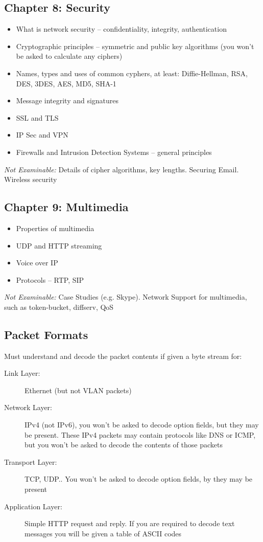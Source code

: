 \documentclass[12pt, a4paper]{article}
\begin{document}
\begin{multicols*}{2}
	\subsection{Chapter 8: Security}
	\begin{itemize}
		\item What is network security -- confidentiality, integrity, authentication
		\item Cryptographic principles -- symmetric and public key algorithms (you won't be asked to calculate any ciphers)
		\item Names, types and uses of common cyphers, at least: Diffie-Hellman, RSA, DES, 3DES, AES, MD5, SHA-1
		\item Message integrity and signatures
		\item SSL and TLS
		\item IP Sec and VPN
		\item Firewalls and Intrusion Detection Systems -- general principles
	\end{itemize}
	\textit{Not Examinable:} Details of cipher algorithms, key lengths. Securing Email. Wireless security
	\subsection{Chapter 9: Multimedia}
	\begin{itemize}
		\item Properties of multimedia
		\item UDP and HTTP streaming
		\item Voice over IP
		\item Protocols -- RTP, SIP
	\end{itemize}
	\textit{Not Examinable:} Case Studies (e.g. Skype). Network Support for multimedia, such as token-bucket, diffserv, QoS
	\subsection{Packet Formats}
	Must understand and decode the packet contents if given a byte stream for:
	\begin{description}
		\item[Link Layer:] Ethernet (but not VLAN packets)
		\item[Network Layer:] IPv4 (not IPv6), you won't be asked to decode option fields, but they may be present. These IPv4 packets may contain protocols like DNS or ICMP, but you won't be asked to decode the contents of those packets
		\item[Transport Layer:] TCP, UDP.. You won't be asked to decode option fields, by they may be present
		\item[Application Layer:] Simple HTTP request and reply. If you are required to decode text messages you will be given a table of ASCII codes
	\end{description}
	\newpage
	

\end{multicols*}
\end{document}
